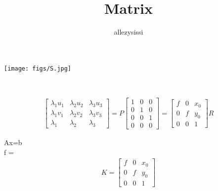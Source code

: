 \documentclass[english]{article}
\begin{document}
\title{Matrix}
\maketitle
\newcommand{\allezysissi}{allezysissi}
\author{\allezysissi}


\begin{figure*}[h!]
    \centering
    \texttt{[image: figs/S.jpg]}

    \caption{^}
    \label{fig:S}
\end{figure*}\\
\clearpage

\begin{gather}
 \begin{bmatrix} \lambda_{1} u_{1} & \lambda_{2} u_{2} & \lambda_{3} u_{3}\\ \lambda_{1} v_{1}  & \lambda_{2} v_{2} & \lambda_{3} v_{3} \\ \lambda_{1} & \lambda_{2} & \lambda_{3}
 \end{bmatrix}
 =
 P
  \begin{bmatrix}
   1 & 0 & 0 \\  0 & 1 & 0 \\  0 & 0 & 1 \\  0 & 0 & 0
   \end{bmatrix}
 =
  \begin{bmatrix}
   f & 0 & x_{0} \\  0 & f & y_{0} \\  0 & 0 & 1
   \end{bmatrix}
   R
\end{gather}

Ax=b\\

f = \\

\begin{gather}
K 
=
\begin{bmatrix}
   f & 0 & x_{0} \\  0 & f & y_{0} \\  0 & 0 & 1 
   \end{bmatrix}
   \end{gather}
\end{document}
